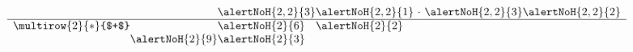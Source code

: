 \begin{frame} 
\[ \begin{array}{l@{}l@{}l@{}l@{}l@{~}l@{~}@{}l@{}l}&&&\alertNoH{2, 2}{{3}}&\alertNoH{2, 2}{{1}}&\cdot&\alertNoH{2, 2}{{3}}&\alertNoH{2, 2}{{2}}\\\hline\multirow{2}{*}{$+$} 
&&&\alertNoH{2}{{6}}&\alertNoH{2}{{2}}\\ 
&&\alertNoH{2}{{9}}&\alertNoH{2}{{3}}\end{array}\] 
\end{frame}